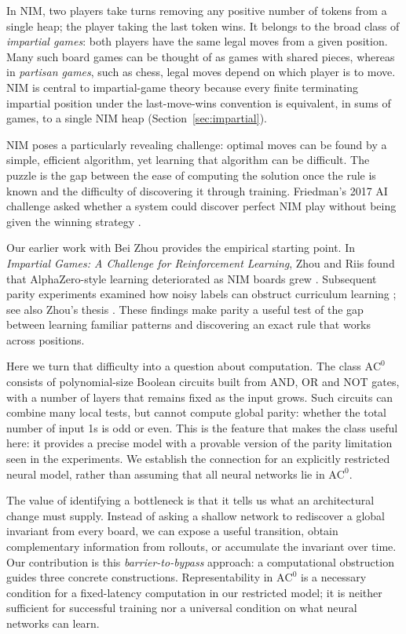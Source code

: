 \documentclass[11pt]{article}
\newcommand{\AC}{\mathrm{AC}}
\theoremstyle{plain}
\theoremstyle{definition}
\theoremstyle{remark}
\numberwithin{equation}{section}
\begin{document}
In NIM, two players take turns removing any positive number of tokens from a single heap; the player taking the last token wins. It belongs to the broad class of \emph{impartial games}: both players have the same legal moves from a given position. Many such board games can be thought of as games with shared pieces, whereas in \emph{partisan games}, such as chess, legal moves depend on which player is to move. NIM is central to impartial-game theory because every finite terminating impartial position under the last-move-wins convention is equivalent, in sums of games, to a single NIM heap (Section~\ref{sec:impartial}).

NIM poses a particularly revealing challenge: optimal moves can be found by a simple, efficient algorithm, yet learning that algorithm can be difficult. The puzzle is the gap between the ease of computing the solution once the rule is known and the difficulty of discovering it through training. Friedman's 2017 AI challenge asked whether a system could discover perfect NIM play without being given the winning strategy \cite{friedman2017challenge}.

Our earlier work with Bei Zhou provides the empirical starting point. In \emph{Impartial Games: A Challenge for Reinforcement Learning}, Zhou and Riis found that AlphaZero-style learning deteriorated as NIM boards grew \cite{zhou2022impartial}. Subsequent parity experiments examined how noisy labels can obstruct curriculum learning \cite{zhou2023parity}; see also Zhou's thesis \cite{zhou2024phd}. These findings make parity a useful test of the gap between learning familiar patterns and discovering an exact rule that works across positions.

Here we turn that difficulty into a question about computation. The class $\AC^0$ consists of polynomial-size Boolean circuits built from AND, OR and NOT gates, with a number of layers that remains fixed as the input grows. Such circuits can combine many local tests, but cannot compute global parity: whether the total number of input 1s is odd or even. This is the feature that makes the class useful here: it provides a precise model with a provable version of the parity limitation seen in the experiments. We establish the connection for an explicitly restricted neural model, rather than assuming that all neural networks lie in $\AC^0$.

The value of identifying a bottleneck is that it tells us what an architectural change must supply. Instead of asking a shallow network to rediscover a global invariant from every board, we can expose a useful transition, obtain complementary information from rollouts, or accumulate the invariant over time. Our contribution is this \emph{barrier-to-bypass} approach: a computational obstruction guides three concrete constructions. Representability in $\AC^0$ is a necessary condition for a fixed-latency computation in our restricted model; it is neither sufficient for successful training nor a universal condition on what neural networks can learn.
\end{document}
